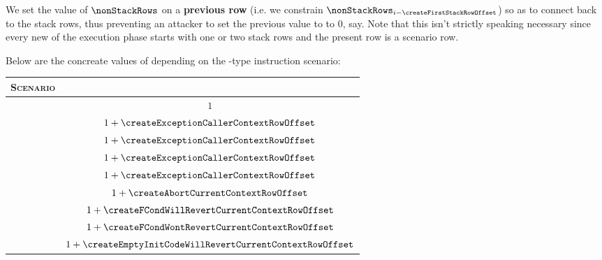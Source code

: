 \saNote{}
We set the value of $\nonStackRows$ on a \textbf{previous row}
(i.e. we constrain $\nonStackRows_{i - \createFirstStackRowOffset}$)
so as to connect back to the stack rows, thus preventing an attacker to set the previous value to \nonStackRows{} to $0$, say.
Note that this isn't strictly speaking necessary since every new \hubStamp{} of the execution phase starts with one or two stack rows and the present row is a scenario row.

Below are the concreate values of \nonStackRows{} depending on the -type instruction scenario: 
\begin{center}
	\begin{tabular}{|l|l|c|} \hline
		\multicolumn{2}{|l|}{\textsc{Scenario}}                                        & \nonStackRows{} \\ \hline \hline
		\scenCreateException{}                                        & \suxSH{}       & $1$               \\ \hline
		\scenCreateException{}                                        & \staticxSH{}   & $1 + \createExceptionCallerContextRowOffset                      $ \\ \hline
		\scenCreateException{}                                        & \maxcsxSH{}    & $1 + \createExceptionCallerContextRowOffset                      $ \\ \hline
		\scenCreateException{}                                        & \mxpxSH{}      & $1 + \createExceptionCallerContextRowOffset                      $ \\ \hline
		\scenCreateException{}                                        & \oogxSH{}      & $1 + \createExceptionCallerContextRowOffset                      $ \\ \hline \hline
		\multicolumn{2}{|l|}{\scenCreateAbort}                                         & $1 + \createAbortCurrentContextRowOffset                         $ \\ \hline \hline
		\multicolumn{2}{|l|}{\scenCreateFCondWillRevert}                               & $1 + \createFCondWillRevertCurrentContextRowOffset               $ \\ \hline
		\multicolumn{2}{|l|}{\scenCreateFCondWontRevert}                               & $1 + \createFCondWontRevertCurrentContextRowOffset               $ \\ \hline \hline
		\multicolumn{2}{|l|}{\scenCreateEmptyInitCodeWillRevert}                       & $1 + \createEmptyInitCodeWillRevertCurrentContextRowOffset       $ \\ \hline

\end{tabular}
\end{center}
